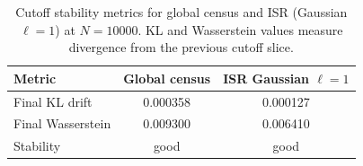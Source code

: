\begin{table}[t]
  \centering
  \caption{Cutoff stability metrics for global census and ISR (Gaussian $\ell=1$) at $N=10000$. KL and Wasserstein values measure divergence from the previous cutoff slice.}
  \label{tab:stability_metrics}
  \begin{tabular}{lcc}
    \toprule
    Metric & Global census & ISR Gaussian $\ell=1$ \\
    \midrule
    Final KL drift & 0.000358 & 0.000127 \\
    Final Wasserstein & 0.009300 & 0.006410 \\
    Stability & good & good \\
    \bottomrule
  \end{tabular}
\end{table}
